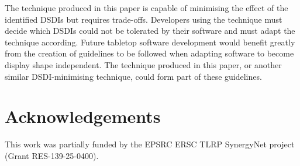 \documentclass[review,5p,times,twocolumn]{elsarticle}
\begin{document}
The technique produced in this paper is capable of minimising the effect of the identified \acp{DSDI} but requires trade-offs.
Developers using the technique must decide which \acp{DSDI} could not be tolerated by their software and must adapt the technique according.
Future tabletop software development would benefit greatly from the creation of guidelines to be followed when adapting software to become display shape independent.
The technique produced in this paper, or another similar \ac{DSDI}-minimising technique, could form part of these guidelines.

\section*{Acknowledgements}

This work was partially funded by the EPSRC ERSC TLRP SynergyNet project (Grant RES-139-25-0400).






\end{document}
